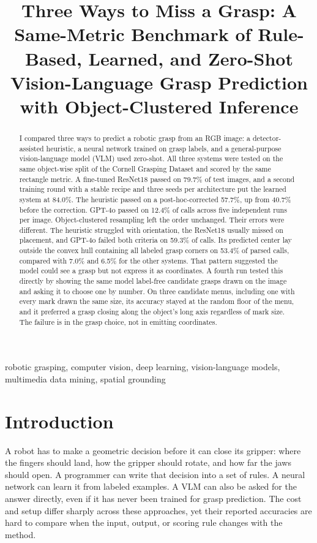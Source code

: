 \documentclass[10pt,conference]{IEEEtran}
\title{Three Ways to Miss a Grasp: A Same-Metric Benchmark of Rule-Based, Learned, and Zero-Shot Vision-Language Grasp Prediction with Object-Clustered Inference}
\author{\IEEEauthorblockN{Anish Talla}
\IEEEauthorblockA{\textit{High School Student}, {[}SCHOOL NAME{]}\\
{[}CITY, STATE{]}, United States\\
{[}EMAIL{]}}}
\begin{document}
\maketitle

\begin{abstract}
I compared three ways to predict a robotic grasp from an RGB image: a
detector-assisted heuristic, a neural network trained on grasp labels, and a
general-purpose vision-language model (VLM) used zero-shot. All three systems
were tested on the same object-wise split of the Cornell Grasping Dataset and
scored by the same rectangle metric. A fine-tuned ResNet18 passed on 79.7\%
of test images, and a second training round with a stable recipe and three
seeds per architecture put the learned system at 84.0\%. The heuristic
passed on a post-hoc-corrected 57.7\%, up from 40.7\% before the
correction. GPT-4o passed on 12.4\% of calls across five independent runs
per image. Object-clustered resampling left the order unchanged. Their errors were different. The heuristic struggled with
orientation, the ResNet18 usually missed on placement, and GPT-4o failed
both criteria on 59.3\% of calls. Its predicted
center lay outside the convex hull containing all labeled grasp corners on 53.4\%
of parsed calls, compared with 7.0\% and 6.5\% for the other systems. That
pattern suggested the model could see a grasp but not express it as
coordinates. A fourth run tested this directly by showing the same model
label-free candidate grasps drawn on the image and asking it to choose one
by number. On three candidate menus, including one with every mark drawn
the same size, its accuracy stayed at the random floor of the menu, and it
preferred a grasp closing along the object's long axis regardless of mark
size. The failure is in the grasp choice, not in emitting coordinates.
\end{abstract}

\begin{IEEEkeywords}
robotic grasping, computer vision, deep learning, vision-language models,
multimedia data mining, spatial grounding
\end{IEEEkeywords}

\section{Introduction}

A robot has to make a geometric decision before it can close its gripper:
where the fingers should land, how the gripper should rotate, and how far the
jaws should open. A programmer can write that decision into a set of rules. A
neural network can learn it from labeled examples. A VLM can also be asked for
the answer directly, even if it has never been trained for grasp prediction.
The cost and setup differ sharply across these approaches, yet their reported
accuracies are hard to compare when the input, output, or scoring rule changes
with the method.
\end{document}
